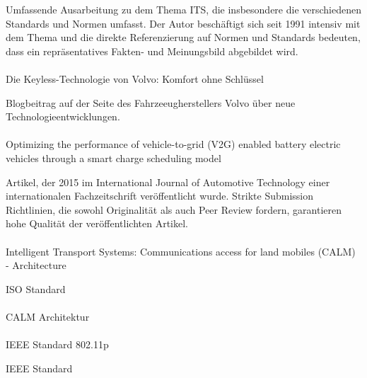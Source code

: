 Umfassende Ausarbeitung zu dem Thema ITS, die insbesondere die verschiedenen Standards und Normen umfasst. Der Autor beschäftigt sich seit 1991 intensiv mit 
dem Thema und die direkte Referenzierung auf Normen und Standards bedeuten, dass ein repräsentatives Fakten- und Meinungsbild abgebildet wird.\\\\

Die Keyless-Technologie von Volvo: Komfort ohne Schlüssel \cite{BP05}

Blogbeitrag auf der Seite des Fahrzeeugherstellers Volvo über neue Technologieentwicklungen.\\\\

Optimizing the performance of vehicle-to-grid (V2G) enabled battery electric vehicles through a smart charge scheduling model \cite{BP08}

Artikel, der 2015 im International Journal of Automotive Technology einer internationalen Fachzeitschrift veröffentlicht wurde. Strikte Submission Richtlinien, die sowohl
Originalität als auch Peer Review fordern, garantieren hohe Qualität der veröffentlichten Artikel.\\\\

Intelligent Transport Systems: Communications access for land mobiles (CALM) - Architecture \cite{BP09}

ISO Standard\\\\

CALM Architektur \cite{BP07}
\\\\

IEEE Standard 802.11p \cite{BP10}

IEEE Standard\\\\